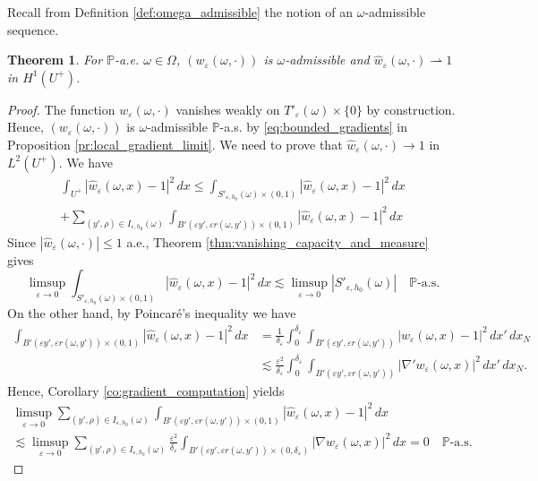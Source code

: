 \documentclass{article}
\numberwithin{equation}{section}
\newtheorem{theorem}{Theorem}[section]
\theoremstyle{definition}
\theoremstyle{remark}
\begin{document}
Recall from Definition \ref{def:omega_admissible} the notion of an $\omega$-admissible sequence.

\begin{theorem} \label{thm:omega_admissible}
    For $\mathbb{P}$-a.e. $\omega \in \Omega$, $(w_\varepsilon(\omega, \cdot))$ is $\omega$-admissible and $\hat{w}_\varepsilon(\omega, \cdot) \rightharpoonup 1$ in $H^1(U^+)$.
\end{theorem}

\begin{proof}
    The function $w_\varepsilon(\omega, \cdot)$ vanishes weakly on $T'_\varepsilon(\omega) \times \{0\}$ by construction. Hence, $(w_\varepsilon(\omega, \cdot))$ is $\omega$-admissible $\mathbb{P}$-a.s. by \eqref{eq:bounded_gradients} in Proposition \ref{pr:local_gradient_limit}. We need to prove that $\hat{w}_\varepsilon(\omega, \cdot) \to 1$ in $L^2(U^+)$. We have
    \begin{multline*}
        \int_{U^+} |\hat{w}_\varepsilon(\omega, x) - 1|^2 \, dx \le \int_{S'_{\varepsilon, h_0}(\omega) \times (0, 1)} |\hat{w}_\varepsilon(\omega, x) - 1|^2 \, dx \\
        + \sum_{(y', \rho) \in I_{\varepsilon, h_0}(\omega)} \int_{B'(\varepsilon y', \varepsilon r(\omega, y')) \times (0, 1)} |\hat{w}_\varepsilon(\omega, x) - 1|^2 \, dx
    \end{multline*}
    Since $|\hat{w}_\varepsilon(\omega, \cdot)| \le 1$ a.e., Theorem \ref{thm:vanishing_capacity_and_measure} gives
    \[
    \limsup_{\varepsilon \to 0} \int_{S'_{\varepsilon, h_0}(\omega) \times (0, 1)} |\hat{w}_\varepsilon(\omega, x) - 1|^2 \, dx \lesssim \limsup_{\varepsilon \to 0} |S'_{\varepsilon, h_0}(\omega)| \quad \mathbb{P}\text{-a.s.}
    \]
    On the other hand, by Poincaré's inequality we have
    \begin{align*}
        \int_{B'(\varepsilon y', \varepsilon r(\omega, y')) \times (0, 1)} |\hat{w}_\varepsilon(\omega, x) - 1|^2 \, dx &= \frac{1}{\delta_\varepsilon} \int_0^{\delta_\varepsilon} \int_{B'(\varepsilon y', \varepsilon r(\omega, y'))} |w_\varepsilon(\omega, x) - 1|^2 \, dx' \, dx_N \\
        &\lesssim \frac{\varepsilon^2}{\delta_\varepsilon} \int_0^{\delta_\varepsilon} \int_{B'(\varepsilon y', \varepsilon r(\omega, y'))} |\nabla' w_\varepsilon(\omega, x)|^2 \, dx' \, dx_N.
    \end{align*}
    Hence, Corollary \ref{co:gradient_computation} yields
    \begin{multline*}
    \limsup_{\varepsilon \to 0} \sum_{(y', \rho) \in I_{\varepsilon, h_0}(\omega)} \int_{B'(\varepsilon y', \varepsilon r(\omega, y')) \times (0, 1)} |\hat{w}_\varepsilon(\omega, x) - 1|^2 \, dx \\
    \lesssim \limsup_{\varepsilon \to 0} \sum_{(y', \rho) \in I_{\varepsilon, h_0}(\omega)} \frac{\varepsilon^2}{\delta_\varepsilon} \int_{B'(\varepsilon y', \varepsilon r(\omega, y')) \times (0, \delta_\varepsilon)} |\nabla w_\varepsilon(\omega, x)|^2 \, dx = 0 \quad \mathbb{P}\text{-a.s.}
    \end{multline*}
\end{proof}
\end{document}
